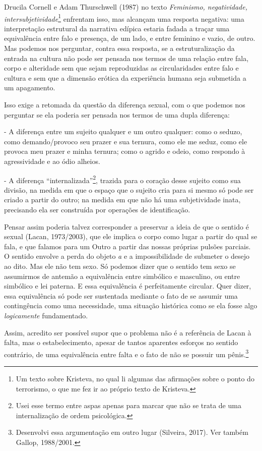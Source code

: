 Drucila Cornell e Adam Thurschwell (1987) no texto \emph{Feminismo,
negatividade, intersubjetividade}\footnote{Um texto sobre Kristeva, no
  qual li algumas das afirmações sobre o ponto do terrorismo, o que me
  fez ir ao próprio texto de Kristeva.} enfrentam isso, mas alcançam uma
resposta negativa: uma interpretação estrutural da narrativa edípica
estaria fadada a traçar uma equivalência entre falo e presença, de um
lado, e entre feminino e vazio, de outro. Mas podemos nos perguntar,
contra essa resposta, se a estruturalização da entrada na cultura não
pode ser pensada nos termos de uma relação entre fala, corpo e
alteridade sem que sejam reproduzidas as circularidades entre falo e
cultura e sem que a dimensão erótica da experiência humana seja
submetida a um apagamento.

Isso exige a retomada da questão da diferença sexual, com o que podemos
nos perguntar se ela poderia ser pensada nos termos de uma dupla
diferença:

- A diferença entre um sujeito qualquer e um outro qualquer: como o
seduzo, como demando/provoco seu prazer e sua ternura, como ele me
seduz, como ele provoca meu prazer e minha ternura; como o agrido e
odeio, como respondo à agressividade e ao ódio alheios.

- A diferença ``internalizada''\footnote{Usei esse termo entre aspas
  apenas para marcar que não se trata de uma internalização de ordem
  psicológica.}, trazida para o coração desse sujeito como sua divisão,
na medida em que o espaço que o sujeito cria para si mesmo só pode ser
criado a partir do outro; na medida em que não há uma subjetividade
inata, precisando ela ser construída por operações de identificação.

Pensar assim poderia talvez corresponder a preservar a ideia de que o
sentido é sexual (Lacan, 1973/2003), que ele implica o corpo como lugar
a partir do qual se fala, e que falamos para um Outro a partir das
nossas próprias pulsões parciais. O sentido envolve a perda do objeto
\emph{a} e a impossibilidade de submeter o desejo ao dito. Mas ele não
tem sexo. Só podemos dizer que o sentido tem sexo se assumirmos de
antemão a equivalência entre simbólico e masculino, ou entre simbólico e
lei paterna. E essa equivalência é perfeitamente circular. Quer dizer,
essa equivalência só pode ser sustentada mediante o fato de se assumir
uma contingência como uma necessidade, uma situação histórica como se
ela fosse algo \emph{logicamente} fundamentado.

Assim, acredito ser possível supor que o problema não é a referência de
Lacan à falta, mas o estabelecimento, apesar de tantos aparentes
esforços no sentido contrário, de uma equivalência entre falta e o fato
de não se possuir um pênis.\footnote{Desenvolvi essa argumentação em
  outro lugar (Silveira, 2017). Ver também Gallop, 1988/2001.}

